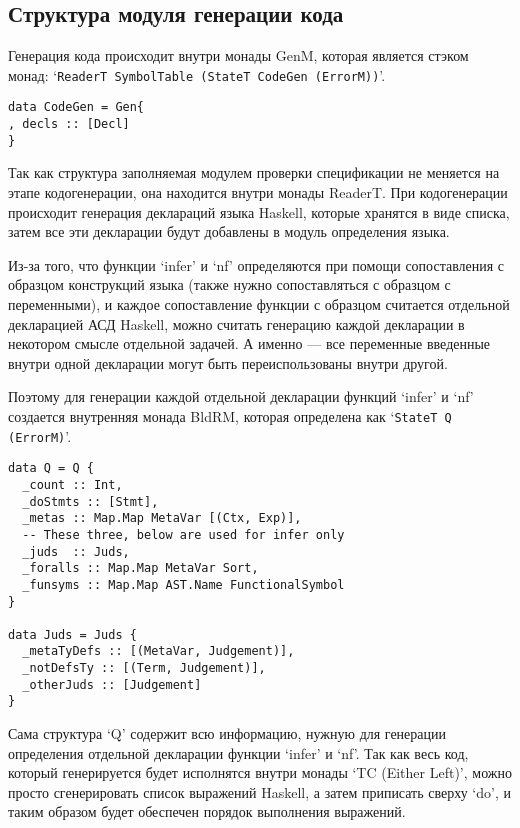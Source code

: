 \subsection{Структура модуля генерации кода}\label{repr}
Генерация кода происходит внутри монады GenM, которая является стэком монад: `\lstinline{ReaderT SymbolTable (StateT CodeGen (ErrorM))}'.

\begin{lstlisting}[caption={Структура используемая при кодогенерации},captionpos=b,frame=single]
data CodeGen = Gen{
, decls :: [Decl]
}
\end{lstlisting}

Так как структура заполняемая модулем проверки спецификации не меняется на этапе кодогенерации, она находится внутри монады ReaderT. При кодогенерации происходит генерация деклараций языка Haskell, которые хранятся в виде списка, затем все эти декларации будут добавлены в модуль определения языка.

Из-за того, что функции `infer' и `nf' определяются при помощи сопоставления с образцом конструкций языка (также нужно сопоставляться с образцом с переменными), и каждое сопоставление функции с образцом считается отдельной декларацией АСД Haskell, можно считать генерацию каждой декларации в некотором смысле отдельной задачей. А именно --- все переменные введенные внутри одной декларации могут быть переиспользованы внутри другой.

Поэтому для генерации каждой отдельной декларации функций `infer' и `nf' создается внутренняя монада BldRM, которая определена как `\lstinline{StateT Q (ErrorM)}'.

\begin{lstlisting}[caption={Структура используемая при кодогенерации функций `infer' и `nf'},captionpos=b,frame=single]
data Q = Q {
  _count :: Int,
  _doStmts :: [Stmt],
  _metas :: Map.Map MetaVar [(Ctx, Exp)],
  -- These three, below are used for infer only
  _juds  :: Juds,
  _foralls :: Map.Map MetaVar Sort,
  _funsyms :: Map.Map AST.Name FunctionalSymbol
}

data Juds = Juds {
  _metaTyDefs :: [(MetaVar, Judgement)],
  _notDefsTy :: [(Term, Judgement)],
  _otherJuds :: [Judgement]
}
\end{lstlisting}

Сама структура `Q' содержит всю информацию, нужную для генерации определения отдельной декларации функции `infer' и `nf'. Так как весь код, который генерируется будет исполнятся внутри монады `TC (Either Left)', можно просто сгенерировать список выражений Haskell, а затем приписать сверху `do', и таким образом будет обеспечен порядок выполнения выражений.

